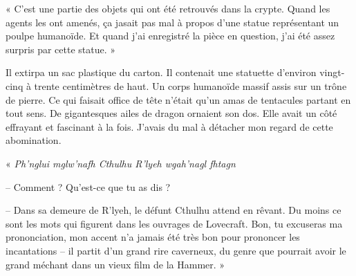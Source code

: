 « C'est une partie des objets qui ont été retrouvés dans la crypte. Quand les agents les ont amenés, ça jasait pas mal
à propos d'une statue représentant un poulpe humanoïde. Et quand j'ai enregistré la pièce en question, j'ai été assez
surpris par cette statue. »

Il extirpa un sac plastique du carton. Il contenait une statuette d'environ vingt-cinq à trente centimètres de haut. Un
corps humanoïde massif assis sur un trône de pierre. Ce qui faisait office de tête n'était qu'un amas de tentacules
partant en tout sens. De gigantesques ailes de dragon ornaient son dos. Elle avait un côté effrayant et fascinant à la
fois. J'avais du mal à détacher mon regard de cette abomination.

« \emph{Ph’nglui mglw’nafh Cthulhu R’lyeh wgah’nagl fhtagn}

-- Comment ? Qu'est-ce que tu as dis ?

-- Dans sa demeure de R'lyeh, le défunt Cthulhu attend en rêvant. Du moins ce sont les mots qui figurent dans les
ouvrages de Lovecraft. Bon, tu excuseras ma prononciation, mon accent n'a jamais été très bon pour prononcer les
incantations -- il partit d'un grand rire caverneux, du genre que pourrait avoir le grand méchant dans un vieux film de
la Hammer. »
